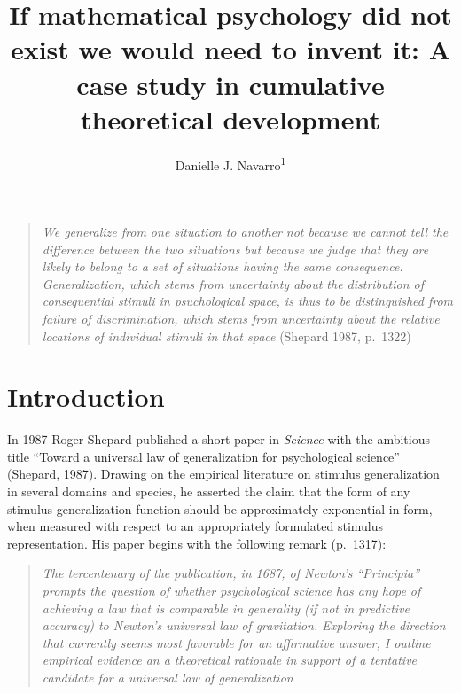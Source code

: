 \documentclass[english,doc]{apa6}
\author{Danielle J. Navarro\textsuperscript{1}}
\affiliation{
\vspace{0.5cm}
\textsuperscript{1} School of Psychology, University of New South Wales}
\title{If mathematical psychology did not exist we would need to invent it: A case study in cumulative theoretical development}
\date{}
\begin{document}
\maketitle

\newpage

\begin{quote}
\emph{We generalize from one situation to another not because we cannot tell the difference between the two situations but because we judge that they are likely to belong to a set of situations having the same consequence. Generalization, which stems from uncertainty about the distribution of consequential stimuli in psuchological space, is thus to be distinguished from failure of discrimination, which stems from uncertainty about the relative locations of individual stimuli in that space} (Shepard 1987, p.~1322)
\end{quote}

\vspace*{12pt}

\hypertarget{introduction}{%
\section{Introduction}\label{introduction}}

\noindent
In 1987 Roger Shepard published a short paper in \emph{Science} with the ambitious title \enquote{Toward a universal law of generalization for psychological science} (Shepard, 1987). Drawing on the empirical literature on stimulus generalization in several domains and species, he asserted the claim that the form of any stimulus generalization function should be approximately exponential in form, when measured with respect to an appropriately formulated stimulus representation. His paper begins with the following remark (p.~1317):

\begin{quote}
\emph{The tercentenary of the publication, in 1687, of Newton's \enquote{Principia} prompts the question of whether psychological science has any hope of achieving a law that is comparable in generality (if not in predictive accuracy) to Newton's universal law of gravitation. Exploring the direction that currently seems most favorable for an affirmative answer, I outline empirical evidence an a theoretical rationale in support of a tentative candidate for a universal law of generalization}
\end{quote}
\end{document}
